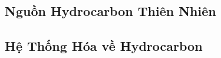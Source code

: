 \documentclass{article}
\numberwithin{equation}{section}
\begin{document}

\subsection{Nguồn Hydrocarbon Thiên Nhiên}


\subsection{Hệ Thống Hóa về Hydrocarbon}


\printbibliography[heading=bibintoc]
	
\end{document}
